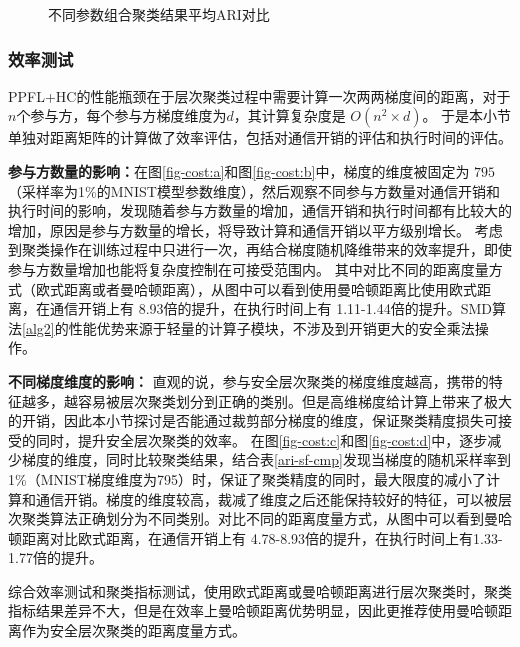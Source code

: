 {\begin{figure}[htb]
{\begin{minipage}[b]{0.45\textwidth}
		\end{minipage}
	}
	\caption{不同参数组合聚类结果平均ARI对比}
	\label{hc-res-cmp}
\end{figure}
}

\subsubsection{效率测试}
PPFL+HC的性能瓶颈在于层次聚类过程中需要计算一次两两梯度间的距离，对于$n$个参与方，每个参与方梯度维度为$d$，其计算复杂度是 $O(n^2\times d)$。
于是本小节单独对距离矩阵的计算做了效率评估，包括对通信开销的评估和执行时间的评估。

\textbf{参与方数量的影响：}在图\ref{fig-cost:a}和图\ref{fig-cost:b}中，梯度的维度被固定为 $795$（采样率为1\%的MNIST模型参数维度），然后观察不同参与方数量对通信开销和执行时间的影响，发现随着参与方数量的增加，通信开销和执行时间都有比较大的增加，原因是参与方数量的增长，将导致计算和通信开销以平方级别增长。
考虑到聚类操作在训练过程中只进行一次，再结合梯度随机降维带来的效率提升，即使参与方数量增加也能将复杂度控制在可接受范围内。
其中对比不同的距离度量方式（欧式距离或者曼哈顿距离），从图中可以看到使用曼哈顿距离比使用欧式距离，在通信开销上有 8.93倍的提升，在执行时间上有 1.11-1.44倍的提升。SMD算法\ref{alg2}的性能优势来源于轻量的计算子模块，不涉及到开销更大的安全乘法操作。

\textbf{不同梯度维度的影响：}
直观的说，参与安全层次聚类的梯度维度越高，携带的特征越多，越容易被层次聚类划分到正确的类别。但是高维梯度给计算上带来了极大的开销，因此本小节探讨是否能通过裁剪部分梯度的维度，保证聚类精度损失可接受的同时，提升安全层次聚类的效率。
在图\ref{fig-cost:c}和图\ref{fig-cost:d}中，逐步减少梯度的维度，同时比较聚类结果，结合表\ref{ari-sf-cmp}发现当梯度的随机采样率到1\%（MNIST梯度维度为795）时，保证了聚类精度的同时，最大限度的减小了计算和通信开销。梯度的维度较高，裁减了维度之后还能保持较好的特征，可以被层次聚类算法正确划分为不同类别。对比不同的距离度量方式，从图中可以看到曼哈顿距离对比欧式距离，在通信开销上有 4.78-8.93倍的提升，在执行时间上有1.33-1.77倍的提升。

综合效率测试和聚类指标测试，使用欧式距离或曼哈顿距离进行层次聚类时，聚类指标结果差异不大，但是在效率上曼哈顿距离优势明显，因此更推荐使用曼哈顿距离作为安全层次聚类的距离度量方式。

